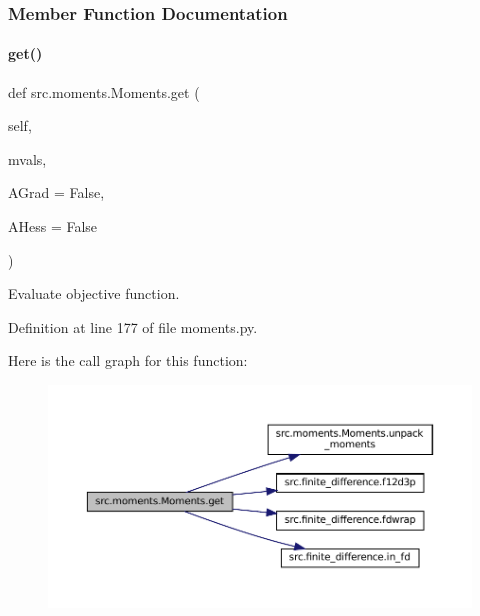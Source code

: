 \subsubsection{Member Function Documentation}
\mbox{\label{classsrc_1_1moments_1_1Moments_ab922ad13aa4aebf311918e1996555a80}} 
\paragraph{\texorpdfstring{get()}{get()}}
{\footnotesize\ttfamily def src.\+moments.\+Moments.\+get (\begin{DoxyParamCaption}\item[{}]{self,  }\item[{}]{mvals,  }\item[{}]{A\+Grad = {\ttfamily False},  }\item[{}]{A\+Hess = {\ttfamily False} }\end{DoxyParamCaption})}



Evaluate objective function. 



Definition at line 177 of file moments.\+py.

Here is the call graph for this function\+:
\nopagebreak
\begin{figure}[H]
\begin{center}
\leavevmode
\includegraphics[width=350pt]{classsrc_1_1moments_1_1Moments_ab922ad13aa4aebf311918e1996555a80_cgraph}
\end{center}
\end{figure}
\mbox{\label{classsrc_1_1moments_1_1Moments_ac12f3ed1e870ec611264267f391752be}} 
